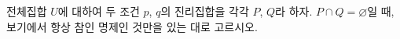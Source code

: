전체집합 $U$에 대하여 두 조건 $p$, $q$의 진리집합을 각각 $P$, $Q$라 하자. $P\cap Q=\varnothing$일 때, 보기에서 항상 참인 명제인 것만을 있는 대로 고르시오. 
